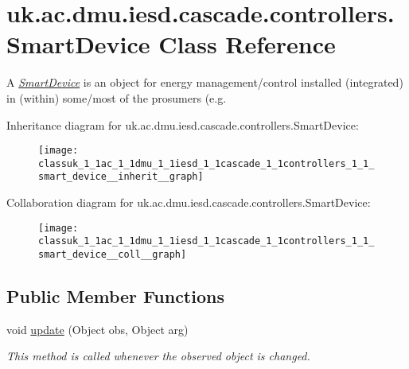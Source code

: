 \hypertarget{classuk_1_1ac_1_1dmu_1_1iesd_1_1cascade_1_1controllers_1_1_smart_device}{\section{uk.\-ac.\-dmu.\-iesd.\-cascade.\-controllers.\-Smart\-Device Class Reference}
\label{classuk_1_1ac_1_1dmu_1_1iesd_1_1cascade_1_1controllers_1_1_smart_device}
}


A {\itshape \hyperlink{classuk_1_1ac_1_1dmu_1_1iesd_1_1cascade_1_1controllers_1_1_smart_device}{Smart\-Device}} is an object for energy management/control installed (integrated) in (within) some/most of the prosumers (e.\-g.  




Inheritance diagram for uk.\-ac.\-dmu.\-iesd.\-cascade.\-controllers.\-Smart\-Device\-:\nopagebreak
\begin{figure}[H]
\begin{center}
\leavevmode
\texttt{[image: classuk\_1\_1ac\_1\_1dmu\_1\_1iesd\_1\_1cascade\_1\_1controllers\_1\_1\_smart\_device\_\_inherit\_\_graph]}
\end{center}
\end{figure}


Collaboration diagram for uk.\-ac.\-dmu.\-iesd.\-cascade.\-controllers.\-Smart\-Device\-:\nopagebreak
\begin{figure}[H]
\begin{center}
\leavevmode
\texttt{[image: classuk\_1\_1ac\_1\_1dmu\_1\_1iesd\_1\_1cascade\_1\_1controllers\_1\_1\_smart\_device\_\_coll\_\_graph]}
\end{center}
\end{figure}
\subsection*{Public Member Functions}
\begin{DoxyCompactItemize}
\item 
void \hyperlink{classuk_1_1ac_1_1dmu_1_1iesd_1_1cascade_1_1controllers_1_1_smart_device_ace97b6fc3cc098a8b70191f7a6be50da}{update} (Object obs, Object arg)
\begin{DoxyCompactList}\small\item\em This method is called whenever the observed object is changed. \end{DoxyCompactList}\end{DoxyCompactItemize}


